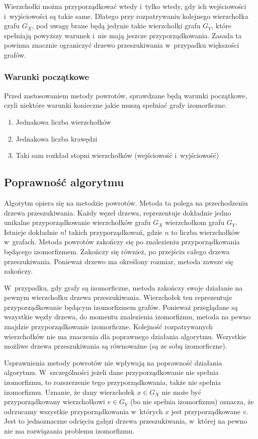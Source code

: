 \documentclass[12pt, a4paper, ]{article} %
\begin{document}
Wierzchołki można przyporządkować wtedy i~tylko wtedy, gdy ich wejściowości i~wyjściowości
są takie same. Dlatego przy rozpatrywaniu kolejnego wierzchołka grafu $G_X$, pod uwagę
brane będą jedynie takie wierzchołki grafu $G_Y$, które spełniają powyższy warunek i~nie
mają jeszcze przyporządkowania. Zasada ta powinna znacznie ograniczyć drzewo przeszukiwania
w~przypadku większości grafów.


\subsubsection{Warunki początkowe}

Przed zastosowaniem metody powrotów, sprawdzane będą warunki początkowe,
czyli niektóre warunki konieczne jakie muszą spełniać grafy izomorficzne.
\begin{enumerate}
  \item Jednakowa liczba wierzchołków
  \item Jednakowa liczba krawędzi
  \item Taki sam rozkład stopni wierzchołków (wejściowość i~wyjściowość)
\end{enumerate}

\subsection{Poprawność algorytmu}

Algorytm opiera się na metodzie powrotów. Metoda ta polega na przechodzeniu
drzewa przeszukiwania. Każdy węzeł drzewa, reprezentuje dokładnie jedno
unikalne przyporządkowanie wierzchołków grafu $G_X$ wierzchołkom grafu $G_Y$.
Istnieje dokładnie $n!$ takich przyporządkowań, gdzie $n$ to liczba wierzchołków
w~grafach. Metoda powrotów zakończy się po znalezieniu przyporządkowania
będącego izomorfizmem. Zakończy się również, po przejściu całego drzewa
przeszukiwania. Ponieważ drzewo ma określony rozmiar, metoda zawsze się zakończy.


W~przypadku, gdy grafy są izomorficzne, metoda zakończy swoje działanie na
pewnym wierzchołku drzewa przeszukiwania. Wierzchołek ten reprezentuje przyporządkowanie
będącym izomorfizmem grafów. Ponieważ przeglądane są wszystkie węzły drzewa, do
momentu znalezienia izomorfizmu, metoda na pewno znajdzie przyporządkowanie izomorficzne.
Kolejność rozpatrywanych wierzchołków nie ma znaczenia dla poprawnego działania algorytmu.
Wszystkie możliwe drzewa przeszukiwania są równoważne (są ze sobą izomorficzne).


Usprawnienia metody powrotów nie wpływają na poprawność działania algorytmu. W~szczególności
jeżeli dane przyporządkowanie nie spełnia izomorfizmu, to rozszerzenie tego przyporządkowania,
także nie spełnia izomorfizmu. Uznanie, że dany wierzchołek $x \in G_X$ nie może być przyporządkowany
wierzchołkowi $v \in G_Y$ (bo nie spełnia izomorfizmu) oznacza, że odrzucamy
wszystkie przyporządkowania w~których $x$ jest przyporządkowane $v$. Jest to jednoznaczne
odcięciu gałęzi drzewa przeszukiwania, w~której na pewno nie ma rozwiązania problemu
izomorfizmu.
\end{document}
